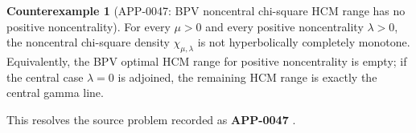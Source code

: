 \documentclass[11pt]{article}
\numberwithin{equation}{section}
\theoremstyle{definition}
\newtheorem{counterexample}[theorem]{Counterexample}
\theoremstyle{remark}
\newcommand{\1}{\mathbf 1}
\begin{document}
\begin{counterexample}[APP-0047: BPV noncentral chi-square HCM range has no positive noncentrality]
\label{res:bpv-noncentral-chi-square-hcm-no-positive-noncentrality}
For every \(\mu>0\) and every positive noncentrality \(\lambda>0\), the noncentral chi-square density \(\chi_{\mu,\lambda}\) is not hyperbolically completely monotone. Equivalently, the BPV optimal HCM range for positive noncentrality is empty; if the central case \(\lambda=0\) is adjoined, the remaining HCM range is exactly the central gamma line.

This resolves the source problem recorded as \textbf{APP-0047} \cite{app-app-0047-source}.
\end{counterexample}
\end{document}
